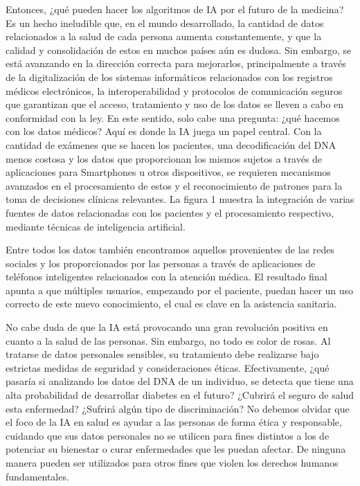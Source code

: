 \documentclass[10pt]{article}
\begin{document}
Entonces, ¿qué pueden hacer los algoritmos de IA por el futuro de la medicina? Es un hecho ineludible que, en el mundo desarrollado, la cantidad de datos relacionados a la salud de cada persona aumenta constantemente, y que la calidad y consolidación de estos en muchos países aún es dudosa. Sin embargo, se está avanzando en la dirección correcta para mejorarlos, principalmente a través de la digitalización de los sistemas informáticos relacionados con los registros médicos electrónicos, la interoperabilidad y protocolos de comunicación seguros que garantizan que el acceso, tratamiento y uso de los datos se lleven a cabo en conformidad con la ley. En este sentido, solo cabe una pregunta: ¿qué hacemos con los datos médicos? Aquí es donde la IA juega un papel central. Con la cantidad de exámenes que se hacen los pacientes, una decodificación del DNA menos costosa y los datos que proporcionan los mismos sujetos a través de aplicaciones para Smartphones u otros dispositivos, se requieren mecanismos avanzados en el procesamiento de estos y el reconocimiento de patrones para la toma de decisiones clínicas relevantes. La figura 1 muestra la integración de varias fuentes de datos relacionadas con los pacientes y el procesamiento respectivo, mediante técnicas de inteligencia artificial.

Entre todos los datos también encontramos aquellos provenientes de las redes sociales y los proporcionados por las personas a través de aplicaciones de teléfonos inteligentes relacionados con la atención médica. El resultado final apunta a que múltiples usuarios, empezando por el paciente, puedan hacer un uso correcto de este nuevo conocimiento, el cual es clave en la asistencia sanitaria.


No cabe duda de que la IA está provocando una gran revolución positiva en cuanto a la salud de las personas. Sin embargo, no todo es color de rosas. Al tratarse de datos personales sensibles, su tratamiento debe realizarse bajo estrictas medidas de seguridad y consideraciones éticas. Efectivamente, ¿qué pasaría si analizando los datos del DNA de un individuo, se detecta que tiene una alta probabilidad de desarrollar diabetes en el futuro? ¿Cubrirá el seguro de salud esta enfermedad? ¿Sufrirá algún tipo de discriminación? No debemos olvidar que el foco de la IA en salud es ayudar a las personas de forma ética y responsable, cuidando que sus datos personales no se utilicen para fines distintos a los de potenciar su bienestar o curar enfermedades que les puedan afectar. De ninguna manera pueden ser utilizados para otros fines que violen los derechos humanos fundamentales.\cite{ruiz_inteligencia_2023} 
\end{document}

